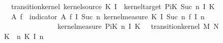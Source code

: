 \begin{isabellebody}
\ \ \ {\isachardoublequoteopen}transition{\isacharunderscore}{\kern0pt}kernel\ {\isacharparenleft}{\kern0pt}kernel{\isacharunderscore}{\kern0pt}source\ {\isacharparenleft}{\kern0pt}K\ {\isacharparenleft}{\kern0pt}I\ {}{\isacharparenright}{\kern0pt}{\isacharparenright}{\kern0pt}{\isacharparenright}{\kern0pt}\ {\isacharparenleft}{\kern0pt}kernel{\isacharunderscore}{\kern0pt}target\ {\isacharparenleft}{\kern0pt}PiK\ {\isacharparenleft}{\kern0pt}Suc\ n{\isacharparenright}{\kern0pt}\ I\ K{\isacharparenright}{\kern0pt}{\isacharparenright}{\kern0pt}\isanewline
\ \ {\isacharparenleft}{\kern0pt}{\isasymlambda}{\isasymomega}\ A{\isacharprime}{\kern0pt}{\isachardot}{\kern0pt}\ {\isasymintegral}\isactrlsup {\isacharplus}{\kern0pt}{\isasymomega}\isactrlsub f{\isachardot}{\kern0pt}\ {\isacharparenleft}{\kern0pt}{\isasymintegral}\isactrlsup {\isacharplus}{\kern0pt}{\isasymomega}{\isachardot}{\kern0pt}\ indicator\ A{\isacharprime}{\kern0pt}\ {\isacharparenleft}{\kern0pt}{\isasymomega}\isactrlsub f\ {\isacharparenleft}{\kern0pt}I\ {\isacharparenleft}{\kern0pt}Suc\ n{\isacharparenright}{\kern0pt}{\isacharcolon}{\kern0pt}{\isacharequal}{\kern0pt}{\isasymomega}{\isacharparenright}{\kern0pt}{\isacharparenright}{\kern0pt}\ {\isasympartial}kernel{\isacharunderscore}{\kern0pt}measure\ {\isacharparenleft}{\kern0pt}K\ {\isacharparenleft}{\kern0pt}I\ {\isacharparenleft}{\kern0pt}Suc\ n{\isacharparenright}{\kern0pt}{\isacharparenright}{\kern0pt}{\isacharparenright}{\kern0pt}\ {\isacharparenleft}{\kern0pt}{\isasymomega}\isactrlsub f\ {\isacharparenleft}{\kern0pt}I\ n{\isacharparenright}{\kern0pt}{\isacharparenright}{\kern0pt}{\isacharparenright}{\kern0pt}\isanewline
\ \ \ \ \ \ \ \ \ \ \ \ \ \ \ \ {\isasympartial}kernel{\isacharunderscore}{\kern0pt}measure\ {\isacharparenleft}{\kern0pt}PiK\ n\ I\ K{\isacharparenright}{\kern0pt}\ {\isasymomega}{\isacharparenright}{\kern0pt}{\isachardoublequoteclose}\ {\isacharparenleft}{\kern0pt}\ {\isachardoublequoteopen}transition{\isacharunderscore}{\kern0pt}kernel\ {\isacharquery}{\kern0pt}M\ {\isacharquery}{\kern0pt}N{\isacharprime}{\kern0pt}\ {\isacharquery}{\kern0pt}{\isasymkappa}{\isachardoublequoteclose}{\isacharparenright}{\kern0pt}\isanewline
%
\isadelimproof
%
\endisadelimproof
%
\isatagproof
{}\isamarkupfalse%
\ {\isacharminus}{\kern0pt}\isanewline
\ \ \isamarkupfalse%
\ {\isacharquery}{\kern0pt}K\ {\isacharequal}{\kern0pt}\ {\isachardoublequoteopen}{\isasymlambda}n{\isachardot}{\kern0pt}\ K\ {\isacharparenleft}{\kern0pt}I\ n{\isacharparenright}{\kern0pt}{\isachardoublequoteclose}\isanewline

\end{isabellebody}
